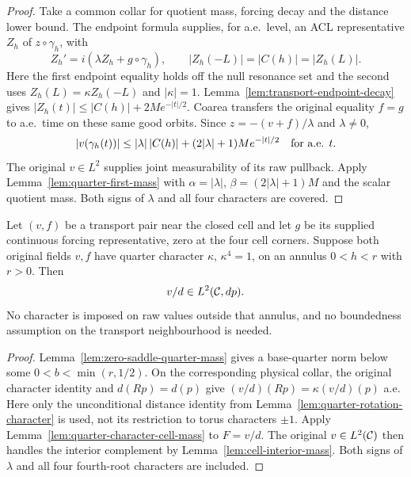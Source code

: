 \begin{proof}
\leanok
Take a common collar for quotient mass, forcing decay and the distance
lower bound. The endpoint formula supplies, for a.e.\ level, an ACL
representative $Z_h$ of $z\circ\gamma_h$, with
\[
 Z_h'=i(\lambda Z_h+g\circ\gamma_h),\qquad
 |Z_h(-L)|=|C(h)|=|Z_h(L)|.
\]
Here the first endpoint equality holds off the null resonance set and
the second uses $Z_h(L)=\kappa Z_h(-L)$ and $|\kappa|=1$.
Lemma~\ref{lem:transport-endpoint-decay} gives
$|Z_h(t)|\le |C(h)|+2M e^{-|t|/2}$.
Coarea transfers the original equality $f=g$ to a.e.\ time on these
same good orbits. Since $z=-(v+f)/\lambda$ and $\lambda\ne0$,
\[
 |v(\gamma_h(t))|
 \le |\lambda|\,|C(h)|+(2|\lambda|+1)M e^{-|t|/2}
 \quad\hbox{for a.e. }t.
\]
The original $v\in L^2$ supplies joint measurability of its raw pullback.
Apply Lemma~\ref{lem:quarter-first-mass} with $\alpha=|\lambda|$,
$\beta=(2|\lambda|+1)M$ and the scalar quotient mass.
Both signs of $\lambda$ and all four characters are covered.
\end{proof}

\begin{lemma}
\label{lem:zero-saddle-character-mass}
\leanok
Let $(v,f)$ be a transport pair near the closed cell and let $g$ be its
supplied continuous forcing representative, zero at the four cell corners.
Suppose both original fields $v,f$ have quarter character $\kappa$,
$\kappa^4=1$, on an annulus $0<h<r$ with $r>0$.
Then
\[
 v/d\in L^2(\mathcal{C},dp).
\]
No character is imposed on raw values outside that annulus, and no
boundedness assumption on the transport neighbourhood is needed.
\end{lemma}

\begin{proof}
\leanok
Lemma~\ref{lem:zero-saddle-quarter-mass} gives a base-quarter norm below
some $0<b<\min(r,1/2)$.
On the corresponding physical collar, the original character identity
and $d(Rp)=d(p)$ give $(v/d)(Rp)=\kappa(v/d)(p)$ a.e.
Here only the unconditional distance identity from
Lemma~\ref{lem:quarter-rotation-character} is used, not its restriction
to torus characters $\pm1$.
Apply Lemma~\ref{lem:quarter-character-cell-mass} to $F=v/d$.
The original $v\in L^2(\mathcal{C})$ then handles the interior complement
by Lemma~\ref{lem:cell-interior-mass}.
Both signs of $\lambda$ and all four fourth-root characters are included.
\end{proof}

